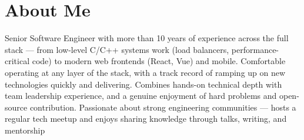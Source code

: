 \documentclass[]{plushcv}
\begin{document}
%
%


%
%

\begin{minipage}[t]{0.70\textwidth} 



\section{About Me}
\vspace{\topsep} %
\begin{minipage}{1.0\textwidth}
Senior Software Engineer with more than 10 years of experience across the full stack — from low-level C/C++ systems work (load balancers, performance-critical code) to modern web frontends (React, Vue) and mobile. Comfortable operating at any layer of the stack, with a track record of ramping up on new technologies quickly and delivering. Combines hands-on technical depth with team leadership experience, and a genuine enjoyment of hard problems and open-source contribution. Passionate about strong engineering communities — hosts a regular tech meetup and enjoys sharing knowledge through talks, writing, and mentorship
\end{minipage}



\end{minipage}
\end{document}
